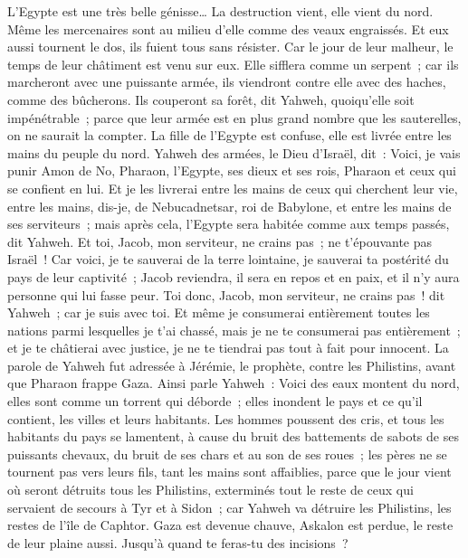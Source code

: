 \begin{multicols}{2}
L'Egypte est une très belle génisse… La destruction vient, elle vient du nord.
Même les mercenaires sont au milieu d'elle comme des veaux engraissés. Et eux aussi tournent le dos, ils fuient tous sans résister. Car le jour de leur malheur, le temps de leur châtiment est venu sur eux.
Elle sifflera comme un serpent~; car ils marcheront avec une puissante armée, ils viendront contre elle avec des haches, comme des bûcherons.
Ils couperont sa forêt, dit Yahweh, quoiqu'elle soit impénétrable~; parce que leur armée est en plus grand nombre que les sauterelles, on ne saurait la compter.
La fille de l'Egypte est confuse, elle est livrée entre les mains du peuple du nord.
Yahweh des armées, le Dieu d'Israël, dit~: Voici, je vais punir Amon de No, Pharaon, l'Egypte, ses dieux et ses rois, Pharaon et ceux qui se confient en lui.
Et je les livrerai entre les mains de ceux qui cherchent leur vie, entre les mains, dis-je, de Nebucadnetsar, roi de Babylone, et entre les mains de ses serviteurs~; mais après cela, l'Egypte sera habitée comme aux temps passés, dit Yahweh.
Et toi, Jacob, mon serviteur, ne crains pas~; ne t'épouvante pas Israël~! Car voici, je te sauverai de la terre lointaine, je sauverai ta postérité du pays de leur captivité~; Jacob reviendra, il sera en repos et en paix, et il n'y aura personne qui lui fasse peur.
Toi donc, Jacob, mon serviteur, ne crains pas~! dit Yahweh~; car je suis avec toi. Et même je consumerai entièrement toutes les nations parmi lesquelles je t'ai chassé, mais je ne te consumerai pas entièrement~; et je te châtierai avec justice, je ne te tiendrai pas tout à fait pour innocent.
\VerseOne{}La parole de Yahweh fut adressée à Jérémie, le prophète, contre les Philistins, avant que Pharaon frappe Gaza.
Ainsi parle Yahweh~: Voici des eaux montent du nord, elles sont comme un torrent qui déborde~; elles inondent le pays et ce qu'il contient, les villes et leurs habitants. Les hommes poussent des cris, et tous les habitants du pays se lamentent,
à cause du bruit des battements de sabots de ses puissants chevaux, du bruit de ses chars et au son de ses roues~; les pères ne se tournent pas vers leurs fils, tant les mains sont affaiblies,
parce que le jour vient où seront détruits tous les Philistins, exterminés tout le reste de ceux qui servaient de secours à Tyr et à Sidon~; car Yahweh va détruire les Philistins, les restes de l'île de Caphtor.
Gaza est devenue chauve, Askalon est perdue, le reste de leur plaine aussi. Jusqu'à quand te feras-tu des incisions~?

\end{multicols}
